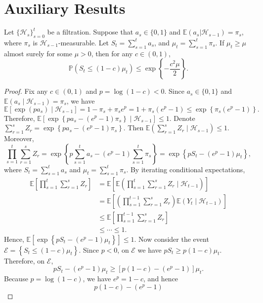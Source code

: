 \documentclass[12pt]{article}
\begin{document}
\section{Auxiliary Results}
\label{app:lemmas}


\begin{lemma}
\label{lem:adaptive_chernoff}
Let $\{\mathcal H_s\}_{s=0}^t$ be a filtration. Suppose that
$a_s\in\{0,1\}$ and $\mathbb E(a_s| \mathcal H_{s-1})=\pi_s$,
where $\pi_s$ is $\mathcal H_{s-1}$-measurable. Let $S_t=\sum_{s=1}^t a_s$, and $\mu_t=\sum_{s=1}^t \pi_s$.
If $\mu_t\ge \mu$ almost surely for some $\mu>0$, then for any
$c\in(0,1)$,
\[
\mathbb P\left(S_t\le (1-c)\mu_t\right)
\le
\exp\left\{
-\frac{c^2\mu}{2}
\right\}.
\]
\end{lemma}


\begin{proof}
Fix any $c\in(0,1)$ and $p=\log(1-c)<0$.
Since $a_s\in\{0,1\}$ and $\mathbb E(a_s\mid \mathcal H_{s-1})=\pi_s$,
we have
\[
\mathbb E\left[\exp(p a_s)\mid \mathcal H_{s-1}\right]
= 1-\pi_s+\pi_s e^p
= 1+\pi_s(e^p-1)
\le \exp\left\{\pi_s(e^p-1)\right\}.
\]
Therefore, $\mathbb E\left[
\exp\left\{ p a_s-(e^p-1)\pi_s \right\}
\mid \mathcal H_{s-1} \right] \le 1$.
Denote $\sum_{r=1}^s Z_r = \exp\left\{ p a_s-(e^p-1)\pi_s \right\}$.
Then $\mathbb E(\sum_{r=1}^s Z_r\mid \mathcal H_{s-1})\le 1$.
Moreover,
\[
\prod_{s=1}^t \sum_{r=1}^s Z_r =
\exp\left\{
p\sum_{s=1}^t a_s - (e^p-1)\sum_{s=1}^t\pi_s
\right\}
= \exp\left\{ pS_t-(e^p-1)\mu_t \right\},
\]
where $S_t=\sum_{s=1}^t a_s$ and $\mu_t=\sum_{s=1}^t \pi_s$.
By iterating conditional expectations,
\begin{align*}
\mathbb E\left[\prod_{s=1}^t \sum_{r=1}^s Z_r\right]
&=
\mathbb E\left[
\mathbb E\left(
\prod_{s=1}^t \sum_{r=1}^s Z_r
\mid \mathcal H_{t-1}
\right)
\right] \\
&=
\mathbb E\left[
\left(\prod_{s=1}^{t-1}\sum_{r=1}^s Z_r\right)
\mathbb E(Y_t\mid \mathcal H_{t-1})
\right] \\
&\le
\mathbb E\left[
\prod_{s=1}^{t-1}\sum_{r=1}^s Z_r
\right] \\
&\le \cdots \le 1.
\end{align*}
Hence, $\mathbb E\left[\exp\left\{pS_t-(e^p-1)\mu_t\right\}\right] \le 1$.
Now consider the event $\mathcal E=\left\{S_t\le (1-c)\mu_t\right\}$.
Since $p<0$, on $\mathcal E$ we have $pS_t \ge p(1-c)\mu_t$.
Therefore, on $\mathcal E$,
\[
pS_t-(e^p-1)\mu_t
\ge
\left[
p(1-c)-(e^p-1)
\right]\mu_t.
\]
Because $p=\log(1-c)$, we have $e^p=1-c$, and hence
\[
p(1-c)-(e^p-1)
\]
\end{proof}
\end{document}
